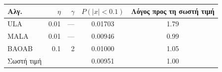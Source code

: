 \begin{tabular}{lrrcc}
\toprule
Αλγ. & $\eta$ & $\gamma$ & $P(\lvert x\rvert<0.1)$ & Λόγος προς τη σωστή τιμή \\
\midrule
ULA & 0.01 & --- & 0.01703 & 1.79 \\
MALA & 0.01 & --- & 0.00946 & 0.99 \\
BAOAB & 0.1 & 2 & 0.01000 & 1.05 \\
\midrule
Σωστή τιμή & & & 0.00951 & 1.00 \\
\bottomrule
\end{tabular}

